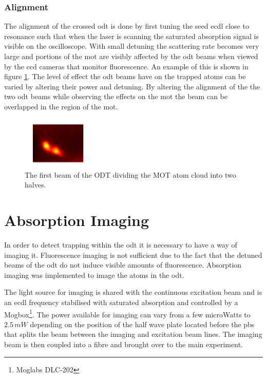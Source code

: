 \subsubsection{Alignment}

The alignment of the crossed \gls{odt} is done by first tuning the seed \gls{ecdl} close to resonance such that when the laser is scanning the saturated absorption signal is visible on the oscilloscope. With small detuning the scattering rate becomes very large and portions of the \gls{mot} are visibly affected by the \gls{odt} beams when viewed by the \gls{ccd} cameras that monitor fluorescence. An example of this is shown in figure \ref{fig:mot_slice}. The level of effect the \gls{odt} beams have on the trapped atoms can be varied by altering their power and detuning. By altering the alignment of the the two \gls{odt} beams while observing the effects on the \gls{mot} the beam can be overlapped in the region of the \gls{mot}.

\begin{figure}[H]
\centering
\includegraphics[width=0.3\textwidth]{figs/mot_slice.pdf}
\caption{The first beam of the ODT dividing the MOT atom cloud into two halves.}
\label{fig:mot_slice}
\end{figure}

\section{Absorption Imaging}

In order to detect trapping within the \gls{odt} it is necessary to have a way of imaging it. Fluorescence imaging is not sufficient due to the fact that the detuned beams of the \gls{odt} do not induce visible amounts of fluorescence. Absorption imaging was implemented to image the atoms in the \gls{odt}.

The light source for imaging is shared with the continuous excitation beam and is an \gls{ecdl} frequency stabilised with saturated absorption and controlled by a Mogbox\footnote{Moglabs DLC-202}. The power available for imaging can vary from a few microWatts to $2.5\,\unit{mW}$ depending on the position of the half wave plate located before the \gls{pbs} that splits the beam between the imaging and excitation beam lines. The imaging beam is then coupled into a fibre and brought over to the main experiment.

